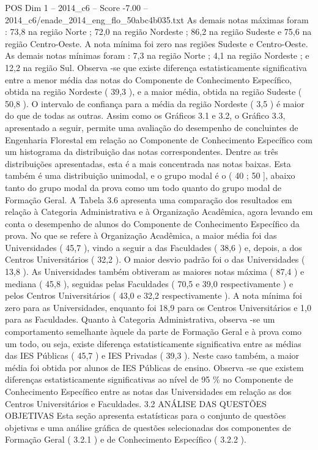 \begin{textsample}{POS Dim 1 – 2014\_c6 – Score -7.00 – 2014\_c6/enade\_2014\_eng\_flo\_50abc4b035.txt}
As demais notas máximas foram : 73,8 na região Norte ; 72,0 na região Nordeste ; 86,2 na região Sudeste e 75,6 na região Centro-Oeste.
A nota mínima foi zero nas regiões Sudeste e Centro-Oeste.
As demais notas mínimas foram : 7,3 na região Norte ; 4,1 na região Nordeste ; e 12,2 na região Sul.
Observa -se que existe diferença estatisticamente significativa entre a menor média das notas do Componente de Conhecimento Específico, obtida na região Nordeste ( 39,3 ), e a maior média, obtida na região Sudeste ( 50,8 ).
O intervalo de confiança para a média da região Nordeste ( 3,5 ) é maior do que de todas as outras.
Assim como os Gráficos 3.1 e 3.2, o Gráfico 3.3, apresentado a seguir, permite uma avaliação do desempenho de concluintes de Engenharia Florestal em relação ao Componente de Conhecimento Específico com um histograma da distribuição das notas correspondentes.
Dentre as três distribuições apresentadas, esta é a mais concentrada nas notas baixas.
Esta também é uma distribuição unimodal, e o grupo modal é o ( 40 ; 50 ], abaixo tanto do grupo modal da prova como um todo quanto do grupo modal de Formação Geral.
A Tabela 3.6 apresenta uma comparação dos resultados em relação à Categoria Administrativa e à Organização Acadêmica, agora levando em conta o desempenho de alunos do Componente de Conhecimento Específico da prova.
No que se refere à Organização Acadêmica, a maior média foi das Universidades ( 45,7 ), vindo a seguir a das Faculdades ( 38,6 ) e, depois, a dos Centros Universitários ( 32,2 ).
O maior desvio padrão foi o das Universidades ( 13,8 ).
As Universidades também obtiveram as maiores notas máxima ( 87,4 ) e mediana ( 45,8 ), seguidas pelas Faculdades ( 70,5 e 39,0 respectivamente ) e pelos Centros Universitários ( 43,0 e 32,2 respectivamente ).
A nota mínima foi zero para as Universidades, enquanto foi 18,9 para os Centros Universitários e 1,0 para as Faculdades.
Quanto à Categoria Administrativa, observa -se um comportamento semelhante àquele da parte de Formação Geral e à prova como um todo, ou seja, existe diferença estatisticamente significativa entre as médias das IES Públicas ( 45,7 ) e IES Privadas ( 39,3 ).
Neste caso também, a maior média foi obtida por alunos de IES Públicas de ensino.
Observa -se que existem diferenças estatisticamente significativas ao nível de 95 \% no Componente de Conhecimento Específico entre as notas das Universidades em relação as dos Centros Universitários e Faculdades. 3.2 ANÁLISE DAS QUESTÕES OBJETIVAS Esta seção apresenta estatísticas para o conjunto de questões objetivas e uma análise gráfica de questões selecionadas dos componentes de Formação Geral ( 3.2.1 ) e de Conhecimento Específico ( 3.2.2 ).

\end{textsample}
